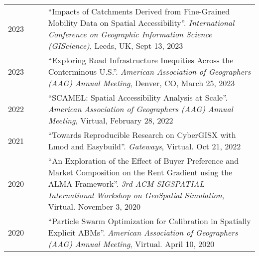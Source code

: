 \documentclass{acmcv}
\begin{document}
    \begin{longtable}{p{0.16\linewidth} p{0.84\linewidth}}
        2023 & ``Impacts of Catchments Derived from Fine-Grained Mobility Data on Spatial Accessibility''. \textit{International Conference on Geographic Information Science (GIScience)}, Leeds, UK, Sept 13, 2023\\

        2023 & ``Exploring Road Infrastructure Inequities Across the Conterminous U.S.''. \textit{American Association of Geographers (AAG) Annual Meeting}, Denver, CO, March 25, 2023\\

        2022 & ``SCAMEL: Spatial Accessibility Analysis at Scale''. \textit{American Association of Geographers (AAG) Annual Meeting}, Virtual, February 28, 2022\\

        2021 & ``Towards Reproducible Research on CyberGISX with Lmod and Easybuild''. \textit{Gateways}, Virtual. Oct 21, 2022\\

        2020 & ``An Exploration of the Effect of Buyer Preference and Market Composition on the Rent Gradient using the ALMA Framework''. \textit{3rd ACM SIGSPATIAL International Workshop on GeoSpatial Simulation}, Virtual. November 3, 2020 \\

        2020 & ``Particle Swarm Optimization for Calibration in Spatially Explicit ABMs''. \textit{American Association of Geographers (AAG) Annual Meeting}, Virtual. April 10, 2020 \\




    \end{longtable}
\end{document}
